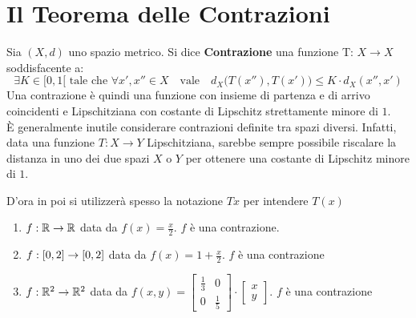 \section{Il Teorema delle Contrazioni}
\begin{definition}[Contrazione]
	\label{def:contrazione}
	Sia $(X, d)$ uno spazio metrico. Si dice \textbf{Contrazione} una funzione T: $X \to X$ soddisfacente a:
	\begin{equation}
		\label{eq:def_contrazione}
		\exists K \in [0, 1[ \text{ tale che } \forall x',x'' \in X \quad \text{vale} \quad d_X \bigl( T(x''), T(x') \bigr) \leq K \cdot d_X(x'', x')
	\end{equation}
	Una contrazione è quindi una funzione con insieme di partenza e di arrivo coincidenti e Lipschitziana con costante di Lipschitz strettamente minore di $1$.\\
	È generalmente inutile considerare contrazioni definite tra spazi diversi. Infatti, data una funzione $T: X \to Y$ Lipschitziana, sarebbe sempre possibile riscalare la distanza in uno dei due spazi $X$ o $Y$ per ottenere una costante di Lipschitz minore di $1$.
	\begin{note}
		D'ora in poi si utilizzerà spesso la notazione $Tx$ per intendere $T(x)$
	\end{note}
\end{definition}
\begin{example}\leavevmode\vspace*{-\baselineskip}
	\begin{enumerate}
		\item $f: \mathbb{R} \to \mathbb{R}$ data da $f(x) = \frac{x}{2}$. $f$ è una contrazione.
		\item $f: \left[0,2\right] \to \left[0,2\right]$ data da $f(x) = 1 + \frac{x}{2}$. $f$ è una contrazione
		\item $f: \mathbb{R}^2 \to \mathbb{R}^2$ data da $f(x,y)=
			\begin{bmatrix}
				\frac{1}{3} & 0\\[1ex]
				0 & \frac{1}{5}
			\end{bmatrix} \cdot
			\begin{bmatrix}
				x\\[1ex]
				y
			\end{bmatrix}$. $f$ è una contrazione
	\end{enumerate}
\end{example}
